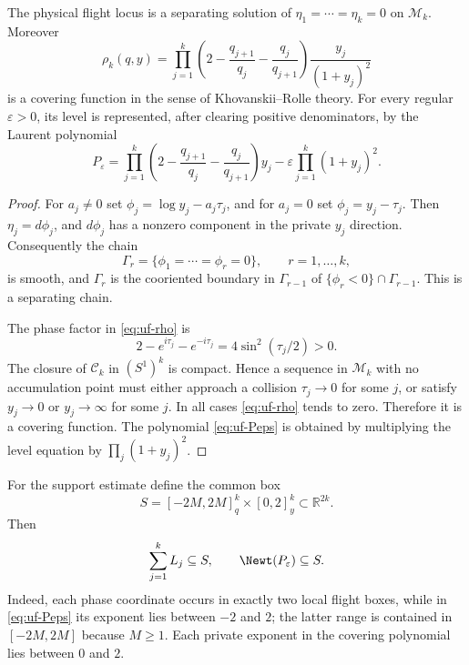 \begin{lemma}\label{lem:uf-covering}
The physical flight locus is a separating solution of
$\eta_1=\cdots=\eta_k=0$ on $\mathcal M_k$.  Moreover
\begin{equation}\label{eq:uf-rho}
 \rho_k(q,y)=\prod_{j=1}^k
 \left(2-\frac{q_{j+1}}{q_j}-\frac{q_j}{q_{j+1}}\right)
 \frac{y_j}{(1+y_j)^2}
\end{equation}
is a covering function in the sense of Khovanskii--Rolle theory.  For every
regular $\varepsilon>0$, its level is represented, after clearing positive
denominators, by the Laurent polynomial
\begin{equation}\label{eq:uf-Peps}
 P_\varepsilon=
 \prod_{j=1}^k
 \left(2-\frac{q_{j+1}}{q_j}-\frac{q_j}{q_{j+1}}\right)y_j
 -\varepsilon\prod_{j=1}^k(1+y_j)^2.
\end{equation}
\end{lemma}

\begin{proof}
For $a_j\ne0$ set $\phi_j=\log y_j-a_j\tau_j$, and for $a_j=0$ set
$\phi_j=y_j-\tau_j$.  Then $\eta_j=d\phi_j$, and $d\phi_j$ has a nonzero
component in the private $y_j$ direction.  Consequently the chain
\[
 \Gamma_r=\{\phi_1=\cdots=\phi_r=0\},\qquad r=1,\ldots,k,
\]
is smooth, and $\Gamma_r$ is the cooriented boundary in $\Gamma_{r-1}$ of
$\{\phi_r<0\}\cap\Gamma_{r-1}$.  This is a separating chain.

The phase factor in \eqref{eq:uf-rho} is
\[
 2-e^{i\tau_j}-e^{-i\tau_j}=4\sin^2(\tau_j/2)>0.
\]
The closure of $\mathcal C_k$ in $(S^1)^k$ is compact.  Hence a sequence in
$\mathcal M_k$ with no accumulation point must either approach a collision
$\tau_j\to0$ for some $j$, or satisfy $y_j\to0$ or $y_j\to\infty$ for some
$j$.  In all cases \eqref{eq:uf-rho} tends to zero.  Therefore it is a covering
function.  The polynomial \eqref{eq:uf-Peps} is obtained by multiplying the
level equation by $\prod_j(1+y_j)^2$.
\end{proof}

For the support estimate define the common box
\begin{equation}\label{eq:uf-S}
 S=[-2M,2M]^k_q\times[0,2]^k_y\subset\mathbb R^{2k}.
\end{equation}
Then
\begin{equation}\label{eq:uf-base-containment}
 \sum_{j=1}^kL_j\subseteq S,
 \qquad
 \Newt(P_\varepsilon)\subseteq S.
\end{equation}
Indeed, each phase coordinate occurs in exactly two local flight boxes, while
in \eqref{eq:uf-Peps} its exponent lies between $-2$ and $2$; the latter range
is contained in $[-2M,2M]$ because $M\ge1$.  Each private exponent in the
covering polynomial lies between $0$ and $2$.

